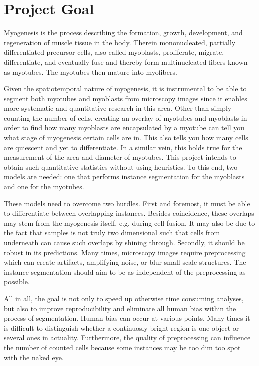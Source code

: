 \section{Project Goal}
Myogenesis is the process describing the formation, growth, development, and regeneration of muscle tissue in the body. Therein mononucleated, partially differentiated precursor cells, also called myoblasts, proliferate, migrate, differentiate, and eventually fuse and thereby form multinucleated fibers known as myotubes. The myotubes then mature into myofibers. 

Given the spatiotemporal nature of myogenesis, it is instrumental to be able to segment both myotubes and myoblasts from microscopy images since it enables more systematic and quantitative research in this area. Other than simply counting the number of cells, creating an overlay of myotubes and myoblasts in order to find how many myoblasts are encapsulated by a myotube can tell you what stage of myogenesis certain cells are in. This also tells you how many cells are quiescent and yet to differentiate. In a similar vein, this holds true for the measurement of the area and diameter of myotubes. This project intends to obtain such quantitative statistics without using heuristics. To this end, two models are needed: one that performs instance segmentation for the myoblasts and one for the myotubes. 

These models need to overcome two hurdles. First and foremost, it must be able to differentiate between overlapping instances. Besides coincidence, these overlaps may stem from the myogenesis itself, e.g. during cell fusion. It may also be due to the fact that samples is not truly two dimensional such that cells from underneath can cause such overlaps by shining through. Secondly, it should be robust in its predictions. Many times, microscopy images require preprocessing which can create artifacts, amplifying noise, or blur small scale structures. The instance segmentation should aim to be as independent of the preprocessing as possible.

All in all, the goal is not only to speed up otherwise time consuming analyses, but also to improve reproducibility and eliminate all human bias within the process of segmentation. Human bias can occur at various points. Many times it is difficult to distinguish whether a continuosly bright region is one object or several ones in actuality. Furthermore, the quality of preprocessing can influence the number of counted cells because some instances may be too dim too spot with the naked eye.
